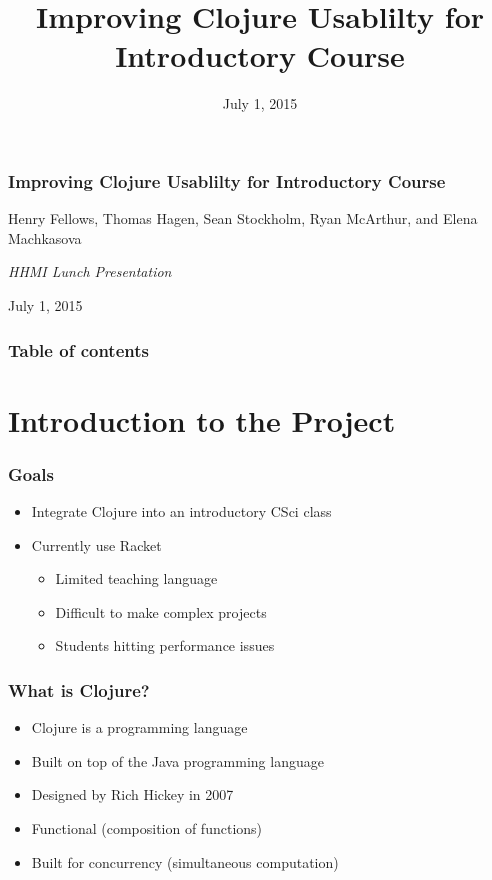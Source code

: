 \documentclass{beamer}
\begin{document}
\title{Improving Clojure Usablilty for Introductory Course}
\date{July 1, 2015}

\begin{frame}
\frametitle {Improving Clojure Usablilty for Introductory Course}
{\centering
\noindent
Henry Fellows, Thomas Hagen, Sean Stockholm, Ryan McArthur, and Elena Machkasova \par

{\it 
HHMI Lunch Presentation\par
July 1, 2015\par}
}
\end{frame}

\begin{frame}
\frametitle{Table of contents}
\tableofcontents  
\end{frame}

\section{Introduction to the Project}

\begin{frame}
	\frametitle{Goals}
	\begin{itemize}
		\item Integrate Clojure into an introductory CSci class
		\item Currently use Racket
		\begin{itemize}
			\item Limited teaching language
			\item Difficult to make complex projects
			\item Students hitting performance issues
		\end{itemize}
	\end{itemize}
\end{frame}

\begin{frame}
	\frametitle{What is Clojure?}
	\begin{itemize}
		\item Clojure is a programming language 
		\item Built on top of the Java programming language
		\item Designed by Rich Hickey in 2007
		\item Functional (composition of functions)
		\item Built for concurrency (simultaneous computation)
	\end{itemize}
\end{frame}
\end{document}
